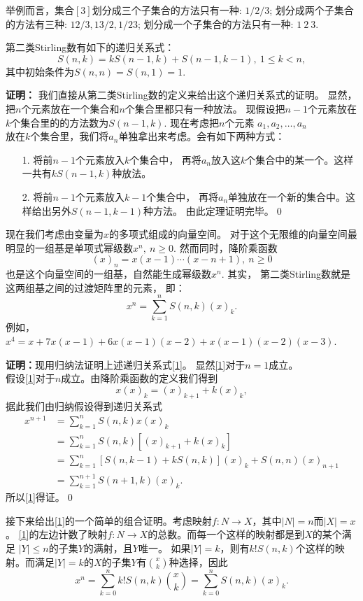 举例而言，集合$[3]$划分成三个子集合的方法只有一种: $1/2/3$;
划分成两个子集合的方法有三种: $12/3,13/2,1/23$;
划分成一个子集合的方法只有一种: $1\ 2\ 3$.


\begin{thm}
第二类Stirling数有如下的递归关系式：
\begin{equation}S(n,k)=kS(n-1,k)+S(n-1,k-1),\ 1\le k<n,\end{equation}
其中初始条件为$S(n,n)=S(n,1)=1.$
\end{thm}
{\bf 证明：}
我们直接从第二类Stirling数的定义来给出这个递归关系式的证明。
显然，把$n$个元素放在一个集合和$n$个集合里都只有一种放法。
现假设把$n-1$个元素放在$k$个集合里的的方法数为$S(n-1,k).$
现在考虑把$n$个元素 $a_1, a_2, \ldots,
a_n$\\放在$k$个集合里，我们将$a_n$单独拿出来考虑。会有如下两种方式：
\begin{itemize}
\item[1. ]将前$n-1$个元素放入$k$个集合中，
再将$a_n$放入这$k$个集合中的某一个。这样一共有$kS(n-1,k)$种放法。
\item[2. ]将前$n-1$个元素放入$k-1$个集合中，
再将$a_n$单独放在一个新的集合中。这样给出另外$S(n-1,k-1)$种方法。
由此定理证明完毕。\qed
\end{itemize}

现在我们考虑由变量为$x$的多项式组成的向量空间。
对于这个无限维的向量空间最明显的一组基是单项式幂级数$x^n,\  n\geq
0.$ 然而同时，降阶乘函数
$$(x)_n=x(x-1)\cdots(x-n+1),\ n\geq 0$$
也是这个向量空间的一组基，自然能生成幂级数$x^n.$ 其实，
第二类Stirling数就是这两组基之间的过渡矩阵里的元素， 即：
\begin{equation}
x^n=\sum_{k=1}^nS(n,k)(x)_k.\label{1}
\end{equation}
例如，$x^4=x+7x(x-1)+6x(x-1)(x-2)+x(x-1)(x-2)(x-3)$.

{\bf 证明：}现用归纳法证明上述递归关系式\ref{1}。
显然\ref{1}对于$n=1$成立。 \\
假设\ref{1}对于$n$成立。由降阶乘函数的定义我们得到
$$x(x)_k=(x)_{k+1}+k(x)_k,$$
据此我们由归纳假设得到递归关系式
\begin{align*}
x^{n+1}&=\sum_{k=1}^nS(n,k)x(x)_k\\
&=\sum_{k=1}^n S(n,k)[(x)_{k+1}+k(x)_k]\\
&=\sum_{k=1}^{n}[S(n,k-1)+kS(n,k)](x)_k+S(n,n)(x)_{n+1}\\
&=\sum_{k=1}^{n+1}S(n+1,k)(x)_k.
\end{align*}
所以\ref{1}得证。\qed

接下来给出\ref{1}的一个简单的组合证明。考虑映射$f:N\rightarrow
X$，其中$|N|=n$而$|X|=x$。 \ref{1}的左边计数了映射$f:N\rightarrow
X$的总数。而每一个这样的映射都是到$X$的某个满足 $|Y|\leq
n$的子集$Y$的满射，且$Y$唯一。
如果$|Y|=k$，则有$k!S(n,k)$个这样的映射。而满足$|Y|=k$的$X$的子集$Y$有${x\choose
k}$种选择，因此
$$x^n=\sum_{k=0}^nk!S(n,k){x\choose k}=\sum_{k=0}^nS(n,k)(x)_k.$$

